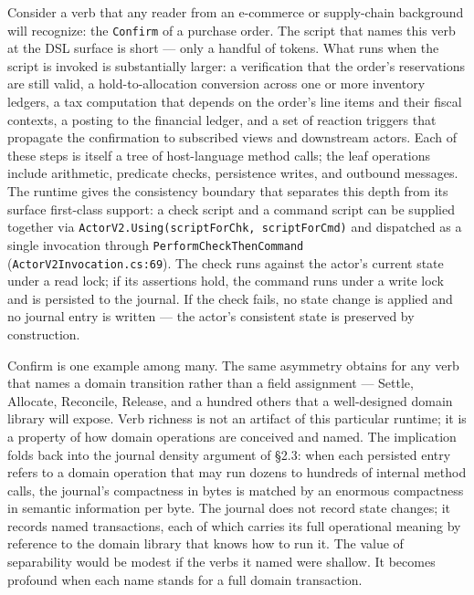 \documentclass[
]{article}
\let\origtexttt\texttt%
\renewcommand{\texttt}[1]{\origtexttt{\seqsplit{#1}}}%
\let\texttt\origtexttt%
\begin{document}
Consider a verb that any reader from an e-commerce or supply-chain
background will recognize: the \texttt{Confirm} of a purchase order. The
script that names this verb at the DSL surface is short --- only a
handful of tokens. What runs when the script is invoked is substantially
larger: a verification that the order's reservations are still valid, a
hold-to-allocation conversion across one or more inventory ledgers, a
tax computation that depends on the order's line items and their fiscal
contexts, a posting to the financial ledger, and a set of reaction
triggers that propagate the confirmation to subscribed views and
downstream actors. Each of these steps is itself a tree of host-language
method calls; the leaf operations include arithmetic, predicate checks,
persistence writes, and outbound messages. The runtime gives the
consistency boundary that separates this depth from its surface
first-class support: a check script and a command script can be supplied
together via \texttt{ActorV2.Using(scriptForChk,\ scriptForCmd)} and
dispatched as a single invocation through
\texttt{PerformCheckThenCommand} (\texttt{ActorV2Invocation.cs:69}). The
check runs against the actor's current state under a read lock; if its
assertions hold, the command runs under a write lock and is persisted to
the journal. If the check fails, no state change is applied and no
journal entry is written --- the actor's consistent state is preserved
by construction.

Confirm is one example among many. The same asymmetry obtains for any
verb that names a domain transition rather than a field assignment ---
Settle, Allocate, Reconcile, Release, and a hundred others that a
well-designed domain library will expose. Verb richness is not an
artifact of this particular runtime; it is a property of how domain
operations are conceived and named. The implication folds back into the
journal density argument of §2.3: when each persisted entry refers to a
domain operation that may run dozens to hundreds of internal method
calls, the journal's compactness in bytes is matched by an enormous
compactness in semantic information per byte. The journal does not
record state changes; it records named transactions, each of which
carries its full operational meaning by reference to the domain library
that knows how to run it. The value of separability would be modest if
the verbs it named were shallow. It becomes profound when each name
stands for a full domain transaction.
\end{document}
